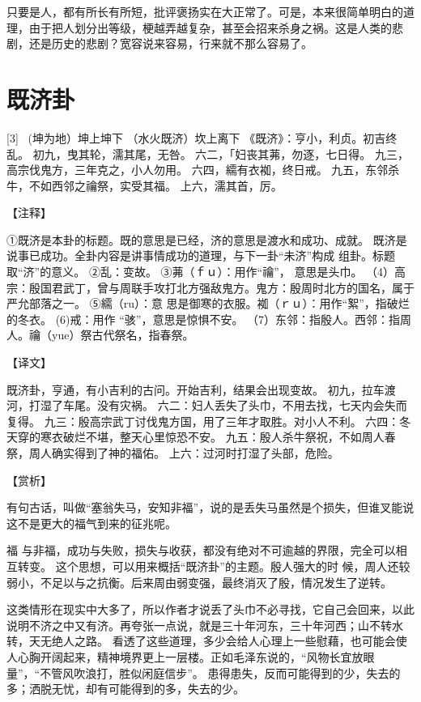 \documentclass[12pt,UTF8]{ctexbook}
\begin{document}
只要是人，都有所长有所短，批评褒扬实在大正常了。可是，本来很简单明白的道理，由于把人划分出等级，梗越弄越复杂，甚至会招来杀身之祸。这是人类的悲剧，还是历史的悲剧？宽容说来容易，行来就不那么容易了。

\chapter{既济卦}
[3] \ (坤为地）坤上坤下
（水火既济）坎上离下
《既济》：亨小，利贞。初吉终乱。
初九，曳其轮，濡其尾，无咎。
六二，「妇丧其茀，勿逐，七日得。
九三，高宗伐鬼方，三年克之，小人勿用。
六四，繻有衣袽，终日戒。
九五，东邻杀牛，不如西邻之禴祭，实受其福。
上六，濡其首，厉。

【注释】

①既济是本卦的标题。既的意思是已经，济的意思是渡水和成功、成就。 既济是说事已成功。全卦内容是讲事情成功的道理，与下一卦“未济”构成 组卦。标题取“济”的意义。
②乱：变故。
③茀（ｆｕ）：用作“禴”， 意思是头巾。
（4）高宗：殷国君武丁，曾与周联手攻打北方强敌鬼方。鬼方：殷周时北方的国名，属于严允部落之一。
⑤繻（ru）：意 思是御寒的衣服。袽（ｒｕ）：用作“絮”，指破烂的冬衣。
(6)戒：用作 “骇”，意思是惊惧不安。
（7）东邻：指殷人。西邻：指周人。禴（yue）祭古代祭名，指春祭。

【译文】

既济卦，亨通，有小吉利的古问。开始吉利，结果会出现变故。
初九，拉车渡河，打湿了车尾。没有灾祸。
六二：妇人丢失了头巾，不用去找，七天内会失而复得。
九三：殷高宗武丁讨伐鬼方国，用了三年才取胜。对小人不利。
六四：冬天穿的寒衣破烂不堪，整天心里惊恐不安。
九五：殷人杀牛祭祝，不如周人春祭，周人确实得到了神的福佑。
上六：过河时打湿了头部，危险。

【赏析】

有句古话，叫做“塞翁失马，安知非福”，说的是丢失马虽然是个损失，但谁叉能说这不是更大的福气到来的征兆呢。

福 与非福，成功与失败，损失与收获，都没有绝对不可逾越的界限，完全可以相互转变。 这个思想，可以用来概括“既济卦”的主题。殷人强大的时 候，周人还较弱小，不足以与之抗衡。后来周由弱变强，最终消灭了殷，情况发生了逆转。

这类情形在现实中大多了，所以作者才说丢了头巾不必寻找，它自己会回来，以此说明不济之中又有济。再夸张一点说，就是三十年河东，三十年河西；山不转水转，天无绝人之路。 看透了这些道理，多少会给人心理上一些慰藉，也可能会使人心胸开阔起来，精神境界更上一层楼。正如毛泽东说的，“风物长宜放眼量”，“不管风吹浪打，胜似闲庭信步”。 患得患失，反而可能得到的少，失去的多；洒脱无忧，却有可能得到的多，失去的少。
\end{document}
